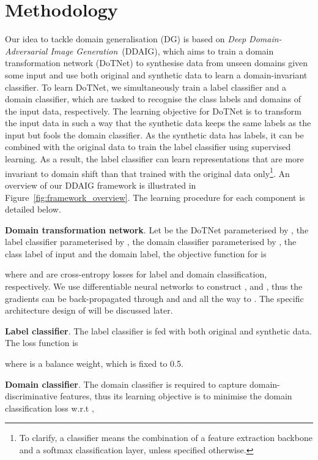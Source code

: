 \documentclass[letterpaper]{article}
\newcommand{\keypoint}[1]{\vspace{0.1cm}\noindent\textbf{#1}}
\begin{document}
\vspace{-0.1cm}
\section{Methodology} \label{sec:methodology}
Our idea to tackle domain generalisation (DG) is based on \emph{Deep Domain-Adversarial Image Generation}~(DDAIG), which aims to train a domain transformation network (DoTNet) to synthesise data from unseen domains given some input and use both original and synthetic data to learn a domain-invariant classifier. To learn DoTNet, we simultaneously train a label classifier and a domain classifier, which are tasked to recognise the class labels and domains of the input data, respectively. The learning objective for DoTNet is to transform the input data in such a way that the synthetic data keeps the same labels as the input but fools the domain classifier. As the synthetic data has labels, it can be combined with the original data to train the label classifier using supervised learning. As a result, the label classifier can learn representations that are more invariant to domain shift than that trained with the original data only\footnote{To clarify, a classifier means the combination of a feature extraction backbone and a softmax classification layer, unless specified otherwise.}. An overview of our DDAIG framework is illustrated in Figure~\ref{fig:framework_overview}. The learning procedure for each component is detailed below.


\keypoint{Domain transformation network}.
Let  be the DoTNet parameterised by ,  the label classifier parameterised by ,  the domain classifier parameterised by ,  the class label of input  and  the domain label, the objective function for  is

where  and  are cross-entropy losses for label and domain classification, respectively. We use differentiable neural networks to construct ,  and , thus the gradients can be back-propagated through  and  and all the way to . The specific architecture  design of  will be discussed later.

\keypoint{Label classifier}.
The label classifier  is fed with both original and synthetic data. The loss function is

where  is a balance weight, which is fixed to 0.5.

\keypoint{Domain classifier}.
The domain classifier  is required to capture domain-discriminative features, thus its learning objective is to minimise the domain classification loss w.r.t ,
\end{document}
